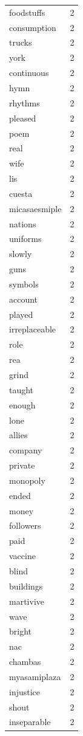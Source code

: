 \begin{tabular}{lr}
foodstuffs & 2 \\
consumption & 2 \\
trucks & 2 \\
york & 2 \\
continuous & 2 \\
hymn & 2 \\
rhythms & 2 \\
pleased & 2 \\
poem & 2 \\
real & 2 \\
wife & 2 \\
lis & 2 \\
cuesta & 2 \\
micasaesmiple & 2 \\
nations & 2 \\
uniforms & 2 \\
slowly & 2 \\
guns & 2 \\
symbols & 2 \\
account & 2 \\
played & 2 \\
irreplaceable & 2 \\
role & 2 \\
rea & 2 \\
grind & 2 \\
taught & 2 \\
enough & 2 \\
lone & 2 \\
allies & 2 \\
company & 2 \\
private & 2 \\
monopoly & 2 \\
ended & 2 \\
money & 2 \\
followers & 2 \\
paid & 2 \\
vaccine & 2 \\
blind & 2 \\
buildings & 2 \\
martivive & 2 \\
wave & 2 \\
bright & 2 \\
nac & 2 \\
chambas & 2 \\
myasamiplaza & 2 \\
injustice & 2 \\
shout & 2 \\
inseparable & 2 \\

\end{tabular}
